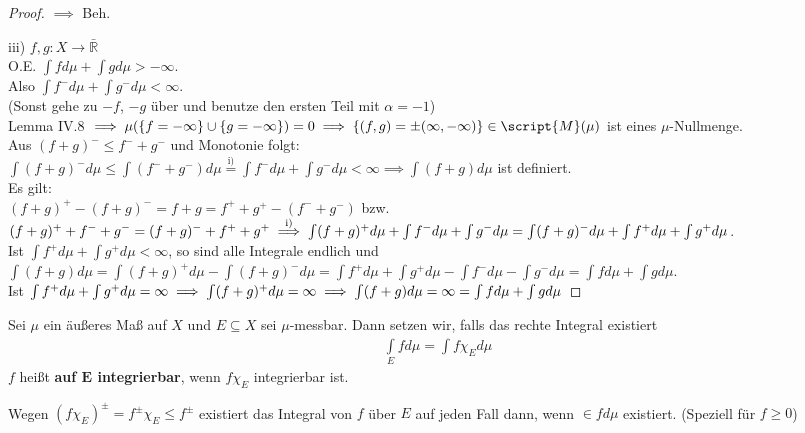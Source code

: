 \begin{proof}
    $\implies$ Beh.
    \item[iii)] $f,g: X\to\mathbb{\bar{R}}$ \\
    O.E. $\int f d\mu + \int g d\mu > -\infty.$ \\ 
    Also $\int f^- d\mu + \int g^- d\mu < \infty$. \\ 
    (Sonst gehe zu $-f$, $-g$ über und benutze den ersten Teil mit $\alpha = -1$) \\
    Lemma IV.8 $\implies \mu(\{f=-\infty \} \cup \{g = -\infty \}) =0\implies \{(f,g) = \pm (\infty,-\infty)  \}\in \script{M}(\mu)$ ist eines $\mu$-Nullmenge. \\
    Aus $(f+g)^- \leq f^- + g^-$ und Monotonie folgt: \\
    $\int (f+g)^- d\mu \leq \int (f^- + g^-) d\mu \overset{\text{i)}}{=} \int f^- d\mu + \int g^- d\mu < \infty \implies \int (f+g) d\mu$ ist definiert. \\
    Es gilt: \\
    $(f+g)^+ - (f+g)^- = f+g = f^+ + g^+ -(f^- + g^- )$ bzw. \\
    $(f+g)^+ + f^- +g^- = (f+g)^- +f^+ + g^+ \\
    \overset{\text{i)}}{\implies} \int (f+g)^+ d\mu + \int f^- d\mu + \int g^- d\mu = \int (f+g)^- d\mu + \int f^+ d\mu + \int g^+ d\mu$.\\
    Ist $\int f^+ d\mu + \int g^+ d\mu < \infty$, so sind alle Integrale endlich und \\ $\int (f+g) d\mu = \int (f+g)^+ d\mu - \int (f+g)^- d\mu = \int f^+ d\mu + \int g^+ d\mu - \int f^- d\mu - \int g^- d\mu = \int f d\mu + \int g d\mu$. \\
    Ist $\int f^+ d\mu + \int g^+ d\mu = \infty \implies \int (f+g)^+ d\mu = \infty \\ \implies \int (f+g) d\mu = \infty = \int f d\mu + \int g d\mu$
  \end{proof}

  \begin{definition}
    Sei $\mu$ ein äußeres Maß auf $X$ und $E \subseteq X$ sei $\mu$-messbar. Dann setzen wir, falls das rechte Integral existiert
    \begin{align*}
      \int\limits_E f d\mu = \int f \chi_E d\mu
    \end{align*}
    $f$ heißt \textbf{auf $\bm{E}$ integrierbar}, wenn $f \chi_E$ integrierbar ist.
  \end{definition}

  \begin{remark}
    Wegen $(f \chi_E)^{\pm} = f^{\pm} \chi_E \leq f^{\pm}$ existiert das Integral von $f$ über $E$ auf jeden Fall dann, wenn $\in f d\mu$ existiert. (Speziell für $f \geq 0$)
  \end{remark}

